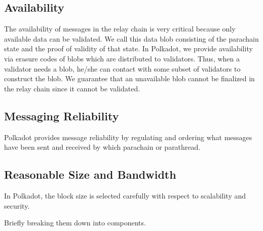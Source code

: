  \subsection{Availability}
The availability of messages in the relay chain is very critical because only available data can be validated. We call this data blob consisting of the parachain state and the proof of validity of that state. In Polkadot, we provide availability via erasure codes of blobs which are distributed to validators. Thus, when a validator needs a blob, he/she can contact with some subset of validators to construct the blob. We guarantee that an unavailable blob cannot be finalized in the relay chain since it cannot be validated.



\subsection{Messaging Reliability} Polkadot provides message reliability by regulating and ordering what messages have been sent and received by which parachain or parathread. 

\subsection{Reasonable Size and Bandwidth} In Polkadot, the block size is selected carefully with respect to scalability and security.  


 Briefly breaking them down into components.
